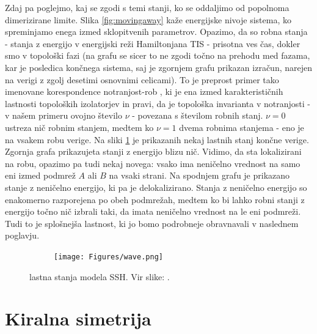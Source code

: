Zdaj pa poglejmo, kaj se zgodi s temi stanji, ko se oddaljimo od popolnoma dimerizirane limite. Slika \ref{fig:movingaway} kaže energijske nivoje sistema, ko spreminjamo enega izmed sklopitvenih parametrov. Opazimo, da so robna stanja - stanja z energijo v energijski reži Hamiltonjana TIS - prisotna ves čas, dokler smo v topološki fazi (na grafu se sicer to ne zgodi točno na prehodu med fazama, kar je posledica končnega sistema, saj je zgornjem grafu prikazan izračun, narejen na verigi z zgolj desetimi osnovnimi celicami). To je preprost primer tako imenovane korespondence notranjost-rob \cite{proof}, ki je ena izmed karakterističnih lastnosti topoloških izolatorjev in pravi, da je topološka invarianta v notranjosti - v našem primeru ovojno število $\nu$ - povezana s številom robnih stanj. $\nu = 0$ ustreza nič robnim stanjem, medtem ko $\nu = 1$ dvema robnima stanjema - eno je na vsakem robu verige.
Na sliki \ref{fig:plots} je prikazanih nekaj lastnih stanj končne verige. 
Zgornja grafa prikazujeta stanji z energijo blizu nič. Vidimo, da sta lokalizirani na robu, opazimo pa tudi nekaj novega: vsako ima neničelno vrednost na samo eni izmed podmrež $A$ ali $B$ na vsaki strani. Na spodnjem grafu je prikazano stanje z neničelno energijo, ki pa je delokalizirano. Stanja z neničelno energijo so enakomerno razporejena po obeh podmrežah, medtem ko bi lahko robni stanji z energijo točno nič izbrali taki, da imata neničelno vrednost na le eni podmreži. Tudi to je splošnejša lastnost, ki jo bomo podrobneje obravnavali v naslednem poglavju.
\begin{figure}[!h]
\centering
\begin{subfigure}{.48\textwidth}
\texttt{[image: Figures/wave.png]}
\end{subfigure}
\caption{lastna stanja modela SSH. Vir slike: \cite{arxiv}.}
\label{fig:plots}
\end{figure} \newpage
\section{Kiralna simetrija}

